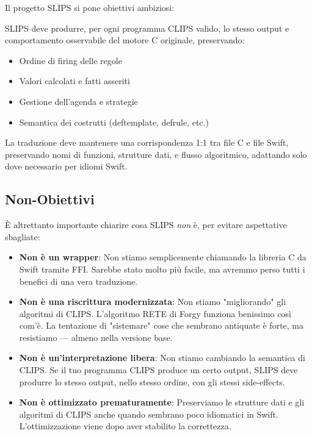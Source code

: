 Il progetto SLIPS si pone obiettivi ambiziosi:

\begin{definizione}
SLIPS deve produrre, per ogni programma CLIPS valido, lo stesso output e comportamento osservabile del motore C originale, preservando:
\begin{itemize}
\item Ordine di firing delle regole
\item Valori calcolati e fatti asseriti
\item Gestione dell'agenda e strategie
\item Semantica dei costrutti (deftemplate, defrule, etc.)
\end{itemize}
\end{definizione}

\begin{definizione}
La traduzione deve mantenere una corrispondenza 1:1 tra file C e file Swift, preservando nomi di funzioni, strutture dati, e flusso algoritmico, adattando solo dove necessario per idiomi Swift.
\end{definizione}

\subsection{Non-Obiettivi}

È altrettanto importante chiarire cosa SLIPS \textit{non} è, per evitare aspettative sbagliate:

\begin{itemize}
\item \textbf{Non è un wrapper}: Non stiamo semplicemente chiamando la libreria C da Swift tramite FFI. Sarebbe stato molto più facile, ma avremmo perso tutti i benefici di una vera traduzione.

\item \textbf{Non è una riscrittura modernizzata}: Non stiamo "migliorando" gli algoritmi di CLIPS. L'algoritmo RETE di Forgy funziona benissimo così com'è. La tentazione di "sistemare" cose che sembrano antiquate è forte, ma resistiamo — almeno nella versione base.

\item \textbf{Non è un'interpretazione libera}: Non stiamo cambiando la semantica di CLIPS. Se il tuo programma CLIPS produce un certo output, SLIPS deve produrre lo stesso output, nello stesso ordine, con gli stessi side-effects.

\item \textbf{Non è ottimizzato prematuramente}: Preserviamo le strutture dati e gli algoritmi di CLIPS anche quando sembrano poco idiomatici in Swift. L'ottimizzazione viene dopo aver stabilito la correttezza.
\end{itemize}

